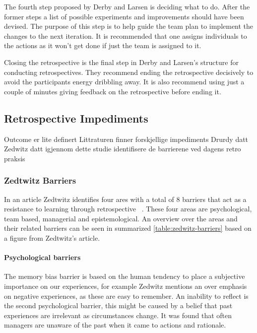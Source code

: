 The fourth step proposed by Derby and Larsen is deciding what to do. After the former steps a list of possible experiments and improvements should have been devised. The purpose of this step is to help guide the team plan to implement the changes to the next iteration. It is recommended that one assigns individuals to the actions as it won't get done if just the team is assigned to it. 

Closing the retrospective is the final step in Derby and Larsen's structure for conducting retrospectives. They recommend ending the retrospective decisively to avoid the participants energy dribbling away. It is also recommend using just a couple of minutes giving feedback on the retrospective before ending it. 

\subsubsection{}

\subsection{Retrospective Impediments}


Outcome er lite definert
Littraturen finner forskjellige impediments
Drurdy datt Zedwitz datt
igjennom dette studie identifisere de barrierene ved dagens retro praksis

\subsubsection{Zedtwitz Barriers}

In an article Zedtwitz identifies four ares with a total of 8 barriers that act as a resistance to learning through retrospective ~\cite{Zedtwitz2002}. These four areas are psychological, team based, managerial and epistemological. An overview over the areas and their related barriers can be seen in summarized \autoref{table:zedwitz-barriers} based on a figure from Zedtwitz's article. 


\paragraph{Psychological barriers}
The memory bias barrier is based on the human tendency to place a subjective importance on our experiences, for example Zedwitz mentions an over emphasis on negative experiences, as these are easy to remember. An inability to reflect is the second psychological barrier, this might be caused by a belief that past experiences are irrelevant as circumstances change. It was found that often managers are unaware of the past when it came to actions and rationale.

